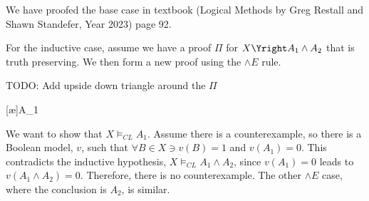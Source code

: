 We have proofed the base case in textbook (Logical Methods by Greg Restall and Shawn Standefer, Year 2023) page 92.

For the inductive case, assume we have a proof $\Pi$ for $X \Yright A_1 \land A_2$ that is truth preserving. We then form a new proof using the $\land E$ rule.

TODO: Add upside down triangle around the $\Pi$

\begin{prooftree*}
[\ae]{A_1}
\end{prooftree*}
We want to show that $X \vDash_{CL} A_1$. Assume there is a counterexample, so there is a Boolean model, $v$, such that $\forall B \in X \ni v(B) = 1$ and $v(A_1) = 0$. This contradicts the inductive hypothesis, $X \vDash_{CL} A_1 \land A_2$, since $v(A_1) = 0$ leads to $v(A_1 \land A_2) = 0$. Therefore, there is no counterexample. The other $\land E$ case, where the conclusion is $A_2$, is similar.
